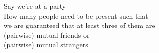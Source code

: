\documentclass[preview]{standalone}
\begin{document}
\begin{center}
Say we're at a party \\ How many people need to be present such that \\ we are guaranteed that at least three of them are \\ (pairwise) mutual friends or\\  (pairwise) mutual strangers
\end{center}
\end{document}
